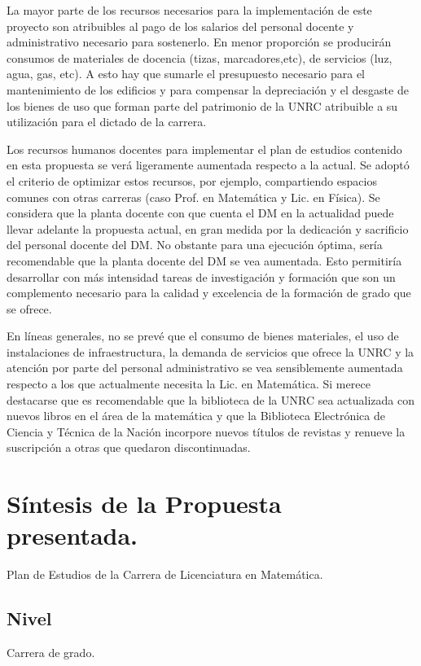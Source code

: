 \documentclass[a4paper, 12pt]{article}
\begin{document}
La mayor parte de los recursos necesarios para la implementación de este proyecto son atribuibles al pago de los salarios del personal docente y administrativo necesario para sostenerlo. En menor proporción se producirán  consumos de materiales de docencia (tizas, marcadores,etc), de servicios (luz, agua, gas, etc). A esto hay que sumarle el presupuesto necesario para el mantenimiento   de los edificios y para compensar la depreciación y el desgaste de los bienes de uso que forman parte del patrimonio de la UNRC atribuible a su utilización para el dictado de  la carrera. 

Los recursos humanos docentes para implementar el  plan de estudios contenido en esta propuesta  se verá ligeramente aumentada respecto a la actual. Se adoptó el criterio de optimizar estos recursos, por ejemplo, compartiendo espacios comunes con otras carreras (caso Prof. en Matemática y Lic. en Física).  Se considera que la planta docente con que cuenta el DM en la actualidad  puede llevar adelante la propuesta actual, en gran medida por la dedicación y sacrificio del personal docente del DM. No obstante para una ejecución óptima,  sería recomendable que la planta docente del DM se vea aumentada. Esto permitiría  desarrollar con más intensidad tareas de investigación y formación  que son un complemento necesario para la calidad y excelencia de la formación de grado que se ofrece. 

 En líneas generales, no se prevé que el consumo de bienes materiales, el uso de instalaciones de infraestructura, la demanda de servicios que ofrece la UNRC  y la atención por parte del personal administrativo  se vea sensiblemente aumentada respecto a los que actualmente necesita la Lic. en Matemática. Si merece destacarse que es recomendable que la biblioteca de la UNRC sea actualizada con nuevos libros en el área de la matemática y que la Biblioteca Electrónica de Ciencia y Técnica de 
la Nación incorpore nuevos títulos de revistas y renueve la suscripción a otras que quedaron discontinuadas. 


\section{Síntesis de la Propuesta presentada. }
Plan de Estudios de la 
Carrera de Licenciatura en Matemática.



\subsection{Nivel} Carrera de grado.
\end{document}
